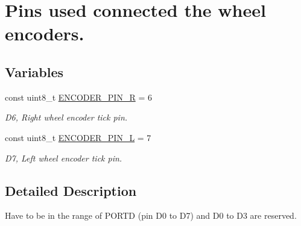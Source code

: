 \hypertarget{group__EncoderPins}{}\section{Pins used connected the wheel encoders.}
\label{group__EncoderPins}
\subsection*{Variables}
\begin{DoxyCompactItemize}
\item 
const uint8\+\_\+t \hyperlink{group__EncoderPins_ga14cc250717e67ba33ff892452b2454b7}{E\+N\+C\+O\+D\+E\+R\+\_\+\+P\+I\+N\+\_\+R} = 6\hypertarget{group__EncoderPins_ga14cc250717e67ba33ff892452b2454b7}{}\label{group__EncoderPins_ga14cc250717e67ba33ff892452b2454b7}

\begin{DoxyCompactList}\small\item\em D6, Right wheel encoder tick pin. \end{DoxyCompactList}\item 
const uint8\+\_\+t \hyperlink{group__EncoderPins_gac51556d78c19fe7342678805ccc77b57}{E\+N\+C\+O\+D\+E\+R\+\_\+\+P\+I\+N\+\_\+L} = 7\hypertarget{group__EncoderPins_gac51556d78c19fe7342678805ccc77b57}{}\label{group__EncoderPins_gac51556d78c19fe7342678805ccc77b57}

\begin{DoxyCompactList}\small\item\em D7, Left wheel encoder tick pin. \end{DoxyCompactList}\end{DoxyCompactItemize}


\subsection{Detailed Description}
Have to be in the range of P\+O\+R\+TD (pin D0 to D7) and D0 to D3 are reserved. 